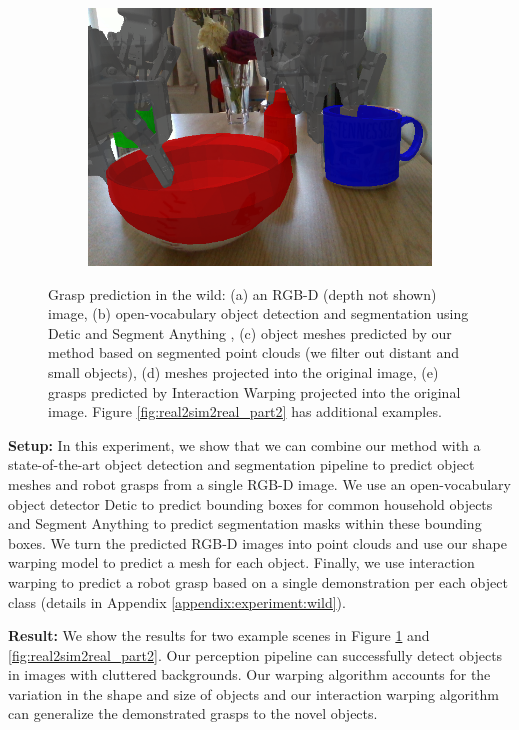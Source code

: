 \documentclass{article}
\begin{document}
\begin{figure}[]
\begin{subfigure}{(\linewidth - 0.05\linewidth)/5}
        \includegraphics[width=\linewidth]{figures/real2sim2real/5/4.png}
        \caption{}
    \end{subfigure}

    \caption{Grasp prediction in the wild: (a) an RGB-D (depth not shown) image, (b) open-vocabulary object detection and segmentation using Detic \cite{zhou22detecting} and Segment Anything \cite{kirillov23segment}, (c) object meshes predicted by our method based on segmented point clouds (we filter out distant and small objects), (d) meshes projected into the original image, (e) grasps predicted by Interaction Warping projected into the original image. Figure \ref{fig:real2sim2real_part2} has additional examples.}
    \label{fig:real2sim2real}
\end{figure}

\textbf{Setup:} In this experiment, we show that we can combine our method with a state-of-the-art object detection and segmentation pipeline to predict object meshes and robot grasps from a single RGB-D image. We use an open-vocabulary object detector Detic \cite{zhou22detecting} to predict bounding boxes for common household objects and Segment Anything \cite{kirillov23segment} to predict segmentation masks within these bounding boxes. We turn the predicted RGB-D images into point clouds and use our shape warping model to predict a mesh for each object. Finally, we use interaction warping to predict a robot grasp based on a single demonstration per each object class (details in Appendix \ref{appendix:experiment:wild}).

\textbf{Result:} We show the results for two example scenes in Figure \ref{fig:real2sim2real} and \ref{fig:real2sim2real_part2}. Our perception pipeline can successfully detect objects in images with cluttered backgrounds. Our warping algorithm accounts for the variation in the shape and size of objects and our interaction warping algorithm can generalize the demonstrated grasps to the novel objects.
\end{document}
